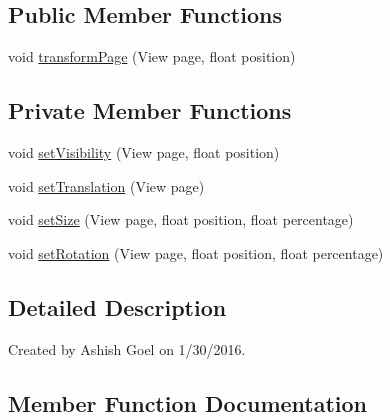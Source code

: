 \subsection*{Public Member Functions}
\begin{DoxyCompactItemize}
\item 
void \hyperlink{classorg_1_1buildmlearn_1_1toolkit_1_1flashcardtemplate_1_1animations_1_1FlipPageTransformer_a3074e2146b6ebcd23da377bd9b163db3}{transform\+Page} (View page, float position)
\end{DoxyCompactItemize}
\subsection*{Private Member Functions}
\begin{DoxyCompactItemize}
\item 
void \hyperlink{classorg_1_1buildmlearn_1_1toolkit_1_1flashcardtemplate_1_1animations_1_1FlipPageTransformer_aa96b3dbec419bfd7e9dcb9796573c186}{set\+Visibility} (View page, float position)
\item 
void \hyperlink{classorg_1_1buildmlearn_1_1toolkit_1_1flashcardtemplate_1_1animations_1_1FlipPageTransformer_a675f7ac167ad7a979bd457e17e8e61c3}{set\+Translation} (View page)
\item 
void \hyperlink{classorg_1_1buildmlearn_1_1toolkit_1_1flashcardtemplate_1_1animations_1_1FlipPageTransformer_ac8cceabef465f7ccd8ac2b8b7a5240b2}{set\+Size} (View page, float position, float percentage)
\item 
void \hyperlink{classorg_1_1buildmlearn_1_1toolkit_1_1flashcardtemplate_1_1animations_1_1FlipPageTransformer_a702656ff20744943c95685734e30fa97}{set\+Rotation} (View page, float position, float percentage)
\end{DoxyCompactItemize}


\subsection{Detailed Description}
Created by Ashish Goel on 1/30/2016. 

\subsection{Member Function Documentation}
